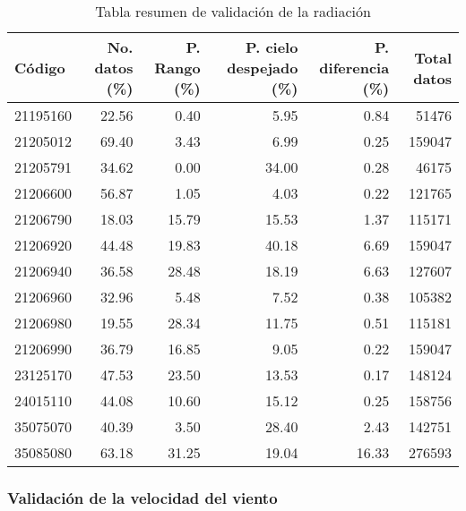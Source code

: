 \documentclass[11pt]{article}
\begin{document}
\begin{table}[H]
\begin{center}


\begin{tabular}{lrrrrr}
\toprule
      Código &  No. datos (\%) &  P. Rango (\%) &  P. cielo despejado (\%) &  P. diferencia (\%) & Total datos \\
\midrule
 21195160 &      22.56 &      0.40 &                5.95 &           0.84 &         51476 \\
 21205012 &      69.40 &      3.43 &                6.99 &           0.25 &        159047 \\
 21205791 &      34.62 &      0.00 &               34.00 &           0.28 &         46175 \\
 21206600 &      56.87 &      1.05 &                4.03 &           0.22 &        121765 \\
 21206790 &      18.03 &     15.79 &               15.53 &           1.37 &        115171 \\
 21206920 &      44.48 &     19.83 &               40.18 &           6.69 &        159047 \\
 21206940 &      36.58 &     28.48 &               18.19 &           6.63 &        127607 \\
 21206960 &      32.96 &      5.48 &                7.52 &           0.38 &        105382 \\
 21206980 &      19.55 &     28.34 &               11.75 &           0.51 &        115181 \\
 21206990 &      36.79 &     16.85 &                9.05 &           0.22 &        159047 \\
 23125170 &      47.53 &     23.50 &               13.53 &           0.17 &        148124 \\
 24015110 &      44.08 &     10.60 &               15.12 &           0.25 &        158756 \\
 35075070 &      40.39 &      3.50 &               28.40 &           2.43 &        142751 \\
 35085080 &      63.18 &     31.25 &               19.04 &          16.33 &        276593 \\
\bottomrule
\end{tabular}
		\caption{Tabla resumen de validación de la radiación}
		\label{tabla:val_radiacion}
\end{center}
\end{table}

\subsubsection{Validación de la velocidad del viento}
\end{document}
